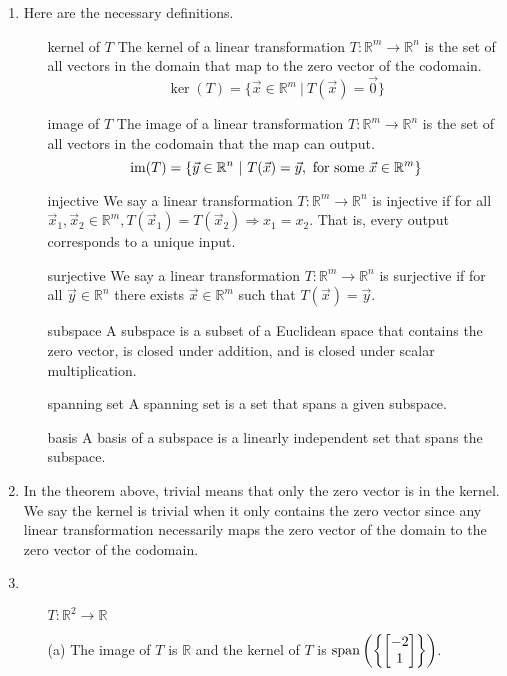 \begin{SaveQuestion}
    \begin{enumerate}
        \item Here are the necessary definitions.
        \begin{itemize}
            \item[kernel of $T$] The kernel of a linear transformation $T: \mathbb{R}^m \rightarrow \mathbb{R}^n$ is the set of all vectors in the domain that map to the zero vector of the codomain. 
            $$\ker(T) = \{\vec x \in \mathbb{R}^m \ | \ T(\vec x) = \vec 0\}$$
            \item[image of $T$] The image of a linear transformation $T: \mathbb{R}^m \rightarrow \mathbb{R}^n$ is the set of all vectors in the codomain that the map can output.
            $$\operatorname{im}(T) = \{\vec y \in \mathbb{R}^n \ | \ T(\vec x) = \vec y, \text{ for some } \vec x \in \mathbb{R}^m\}$$
            \item[injective] We say a linear transformation $T: \mathbb{R}^m \rightarrow \mathbb{R}^n$ is injective if for all $\vec x_1, \vec x_2 \in \mathbb{R}^m, T(\vec x_1) = T(\vec x_2) \Longrightarrow x_1 = x_2$. That is, every output corresponds to a unique input. 
            \item[surjective] We say a linear transformation $T: \mathbb{R}^m \rightarrow \mathbb{R}^n$ is surjective if for all $\vec y \in \mathbb{R}^n$ there exists $\vec x \in \mathbb{R}^m$ such that $T(\vec x) = \vec y$. 
            \item[subspace] A subspace is a subset of a Euclidean space that contains the zero vector, is closed under addition, and is closed under scalar multiplication. 
            \item[spanning set] A spanning set is a set that spans a given subspace. 
            \item[basis] A basis of a subspace is a linearly independent set that spans the subspace.
        \end{itemize}
        \item In the theorem above, trivial means that only the zero vector is in the kernel. We say the kernel is trivial when it only contains the zero vector since any linear transformation necessarily maps the zero vector of the domain to the zero vector of the codomain. 
        \item 
        \begin{itemize}
            \item[] $T: \mathbb{R}^2 \rightarrow \mathbb{R}$ \\
            \item[(a)] The image of $T$ is $\mathbb{R}$ and the kernel of $T$ is $\operatorname{span}\left(\left\{\begin{bmatrix} -2 \\ 1 \end{bmatrix}\right\}\right)$.

\end{itemize}
\end{enumerate}
\end{SaveQuestion}
